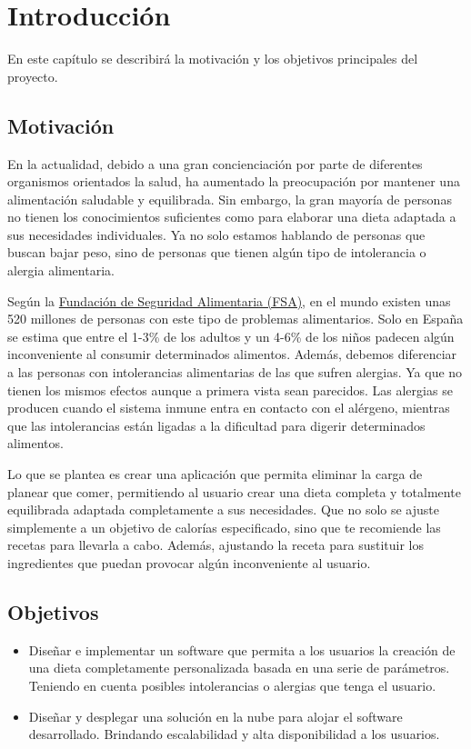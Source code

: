 \chapter{Introducción}
En este capítulo se describirá la motivación y los objetivos principales del proyecto.

\section{Motivación}
En la actualidad, debido a una gran concienciación por parte de diferentes organismos orientados la salud, ha aumentado la preocupación por mantener una alimentación saludable y equilibrada. Sin embargo, la gran mayoría de personas no tienen los conocimientos suficientes como para elaborar una dieta adaptada a sus necesidades individuales. Ya no solo estamos hablando de personas que buscan bajar peso, sino de personas que tienen algún tipo de intolerancia o alergia alimentaria. 

Según la \href{https://funsapa.org/alergia-alimentaria/incidencia/}{Fundación de Seguridad Alimentaria (FSA)}, en el mundo existen unas 520 millones de personas con este tipo de problemas alimentarios. Solo en España se estima que entre el 1-3\% de los adultos y un 4-6\% de los niños padecen algún inconveniente al consumir determinados alimentos. Además, debemos diferenciar a las personas con intolerancias alimentarias de las que sufren alergias. Ya que no tienen los mismos efectos aunque a primera vista sean parecidos. Las alergias se producen cuando el sistema inmune entra en contacto con el alérgeno, mientras que las intolerancias están ligadas a la dificultad para digerir determinados alimentos.

Lo que se plantea es crear una aplicación que permita eliminar la carga de planear que comer, permitiendo al usuario crear una dieta completa y totalmente equilibrada adaptada completamente a sus necesidades. Que no solo se ajuste simplemente a un objetivo de calorías especificado, sino que te recomiende las recetas para llevarla a cabo. Además, ajustando la receta para sustituir los ingredientes que puedan provocar algún inconveniente al usuario.

\section{Objetivos}
\begin{itemize}
    \item Diseñar e implementar un software que permita a los usuarios la creación de una dieta completamente personalizada basada en una serie de parámetros. Teniendo en cuenta posibles intolerancias o alergias que tenga el usuario. 
    \item Diseñar y desplegar una solución en la nube para alojar el software desarrollado. Brindando escalabilidad y alta disponibilidad a los usuarios. 
\end{itemize}